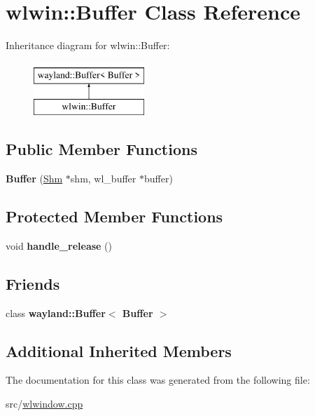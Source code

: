 \hypertarget{classwlwin_1_1Buffer}{}\section{wlwin\+::Buffer Class Reference}
\label{classwlwin_1_1Buffer}
Inheritance diagram for wlwin\+::Buffer\+:\begin{figure}[H]
\begin{center}
\leavevmode
\includegraphics[height=2.000000cm]{classwlwin_1_1Buffer}
\end{center}
\end{figure}
\subsection*{Public Member Functions}
\begin{DoxyCompactItemize}
\item 
\mbox{\label{classwlwin_1_1Buffer_a6cdbe90d71bd1864b6674e182dfbed6a}} 
{\bfseries Buffer} (\mbox{\hyperlink{classwlwin_1_1Shm}{Shm}} $\ast$shm, wl\+\_\+buffer $\ast$buffer)
\end{DoxyCompactItemize}
\subsection*{Protected Member Functions}
\begin{DoxyCompactItemize}
\item 
\mbox{\label{classwlwin_1_1Buffer_a5cffe1643341fe4983461207e4e9d498}} 
void {\bfseries handle\+\_\+release} ()
\end{DoxyCompactItemize}
\subsection*{Friends}
\begin{DoxyCompactItemize}
\item 
\mbox{\label{classwlwin_1_1Buffer_adbfed73b7d4071ea59a8cf42ccb8fecd}} 
class {\bfseries wayland\+::\+Buffer$<$ Buffer $>$}
\end{DoxyCompactItemize}
\subsection*{Additional Inherited Members}


The documentation for this class was generated from the following file\+:\begin{DoxyCompactItemize}
\item 
src/\mbox{\hyperlink{wlwindow_8cpp}{wlwindow.\+cpp}}\end{DoxyCompactItemize}
